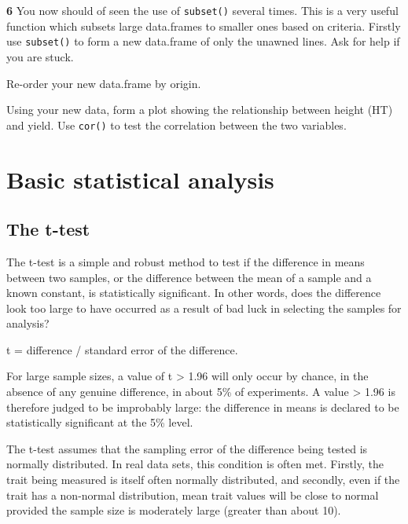 \documentclass[
]{book}
\makeatletter
\newenvironment{kframe}{%
\medskip{}
\setlength{\fboxsep}{.8em}
 \def\at@end@of@kframe{}%
 \ifinner\ifhmode%
  \def\at@end@of@kframe{\end{minipage}}%
  \begin{minipage}{\columnwidth}%
 \fi\fi%
 \def\FrameCommand##1{\hskip\@totalleftmargin \hskip-\fboxsep
 \colorbox{shadecolor}{##1}\hskip-\fboxsep
     \hskip-\linewidth \hskip-\@totalleftmargin \hskip\columnwidth}%
 \MakeFramed {\advance\hsize-\width
   \@totalleftmargin\z@ \linewidth\hsize
   \@setminipage}}%
 {\par\unskip\endMakeFramed%
 \at@end@of@kframe}
\newenvironment{rmdblock}[1]
  {
  \begin{itemize}
  \renewcommand{\labelitemi}{
    \raisebox{-.7\height}[0pt][0pt]{
      {\setkeys{Gin}{width=3em,keepaspectratio}\texttt{[image: images/\#1]}}
    }
  }
  \setlength{\fboxsep}{1em}
  \begin{kframe}
  \item
  }
  {
  \end{kframe}
  \end{itemize}
  }
\newenvironment{rmdquiz}
  {\begin{rmdblock}{quiz}}
  {\end{rmdblock}}
\makeatother
\begin{document}
\begin{rmdquiz}
\textbf{6} You now should of seen the use of \texttt{subset()} several times. This is a very useful function which subsets large data.frames to smaller ones based on criteria. Firstly use \texttt{subset()} to form a new data.frame of only the unawned lines. Ask for help if you are stuck.

Re-order your new data.frame by origin.

Using your new data, form a plot showing the relationship between height (HT) and yield.
Use \texttt{cor()} to test the correlation between the two variables.
\end{rmdquiz}

\hypertarget{basic-statistical-analysis}{%
\section{Basic statistical analysis}\label{basic-statistical-analysis}}

\hypertarget{the-t-test}{%
\subsection{The t-test}\label{the-t-test}}

The t-test is a simple and robust method to test if the difference in means between two samples, or the difference between the mean of a sample and a known constant, is statistically significant. In other words, does the difference look too large to have occurred as a result of bad luck in selecting the samples for analysis?

t = difference / standard error of the difference.

For large sample sizes, a value of t \textgreater{} 1.96 will only occur by chance, in the absence of any genuine difference, in about 5\% of experiments. A value \textgreater{} 1.96 is therefore judged to be improbably large: the difference in means is declared to be statistically significant at the 5\% level.

The t-test assumes that the sampling error of the difference being tested is normally distributed. In real data sets, this condition is often met. Firstly, the trait being measured is itself often normally distributed, and secondly, even if the trait has a non-normal distribution, mean trait values will be close to normal provided the sample size is moderately large (greater than about 10).
\end{document}
